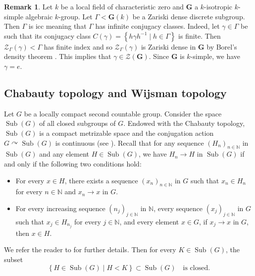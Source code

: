 \documentclass[11pt]{amsart}
\numberwithin{equation}{section}
\theoremstyle{plain}
\theoremstyle{definition}
\newtheorem{rem}[thm]{Remark}
\newcommand{\N}{\mathbb{N}}
\newcommand{\Sub}{\operatorname{Sub}}
\begin{document}
\begin{rem}\label{remark-icc}
 Let $k$ be a local field of characteristic zero and $\mathbf G$ a $k$-isotropic $k$-simple algebraic $k$-group. Let $\Gamma < \mathbf G(k)$ be a Zariski dense discrete subgroup. Then $\Gamma$ is icc meaning that $\Gamma$ has infinite conjugacy classes. Indeed, let $\gamma \in \Gamma$ be such that its conjugacy class $C(\gamma) = \left \{ h \gamma h^{-1} \mid h \in \Gamma\right \}$ is finite. Then $\mathscr Z_\Gamma(\gamma) < \Gamma$ has finite index and so $\mathscr Z_\Gamma(\gamma)$ is Zariski dense in $\mathbf G$ by Borel's density theorem \cite{Bo60}. This implies that $\gamma \in \mathscr Z(\mathbf G)$. Since $\mathbf G$ is $k$-simple, we have $\gamma = e$.
\end{rem}


\subsection{Chabauty topology and Wijsman topology}


Let $G$ be a locally compact second countable group. Consider the space $\Sub(G)$ of all closed subgroups of $G$. Endowed with the Chabauty topology, $\Sub(G)$ is a compact metrizable space and the conjugation action $G \curvearrowright \Sub(G)$ is continuous (see \cite{Ch50}). Recall that for any sequence $(H_n)_{n \in \N}$ in $\Sub(G)$ and any element $H \in \Sub(G)$, we have $H_n \to H$ in $\Sub(G)$ if and only if the following two conditions hold:
\begin{itemize}
\item [$(\rm i)$] For every $x \in H$, there exists a sequence $(x_n)_{n \in \N}$ in $G$ such that $x_n \in H_n$ for every $n \in \N$ and $x_n \to x$ in $G$. 
\item [$(\rm ii)$] For every increasing sequence $(n_j)_{j \in \N}$ in $\N$, every sequence $(x_{j})_{j \in \N}$ in $G$ such that $x_{j} \in H_{n_j}$ for every $j \in \N$, and every element $x \in G$, if $x_{j} \to x$ in $G$, then $x \in H$.
\end{itemize}
We refer the reader to \cite[Section E.1]{BP92} for further details. Then for every $K \in \Sub(G)$, the subset
\begin{equation}\label{eq-closed-bis}
\left \{H \in \Sub(G) \mid H < K \right \} \subset \Sub(G) \quad \text{is closed}.
\end{equation}
\end{document}
